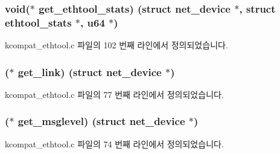 \subsubsection[{\texorpdfstring{get\+\_\+ethtool\+\_\+stats}{get_ethtool_stats}}]{\setlength{\rightskip}{0pt plus 5cm}void($\ast$ get\+\_\+ethtool\+\_\+stats) (struct net\+\_\+device $\ast$, struct {\bf ethtool\+\_\+stats} $\ast$, {\bf u64} $\ast$)}\hypertarget{struct__kc__ethtool__ops_a99f0ffd8f8f7b5def21d92213498fa0b}{}\label{struct__kc__ethtool__ops_a99f0ffd8f8f7b5def21d92213498fa0b}


kcompat\+\_\+ethtool.\+c 파일의 102 번째 라인에서 정의되었습니다.

\subsubsection[{\texorpdfstring{get\+\_\+link}{get_link}}]{($\ast$ get\+\_\+link) (struct net\+\_\+device $\ast$)}\hypertarget{struct__kc__ethtool__ops_a307865bb1477a00183755924a7b40e08}{}\label{struct__kc__ethtool__ops_a307865bb1477a00183755924a7b40e08}


kcompat\+\_\+ethtool.\+c 파일의 77 번째 라인에서 정의되었습니다.

\subsubsection[{\texorpdfstring{get\+\_\+msglevel}{get_msglevel}}]{($\ast$ get\+\_\+msglevel) (struct net\+\_\+device $\ast$)}\hypertarget{struct__kc__ethtool__ops_a7e348d9318763960baa021d8bbd21d7b}{}\label{struct__kc__ethtool__ops_a7e348d9318763960baa021d8bbd21d7b}


kcompat\+\_\+ethtool.\+c 파일의 74 번째 라인에서 정의되었습니다.

